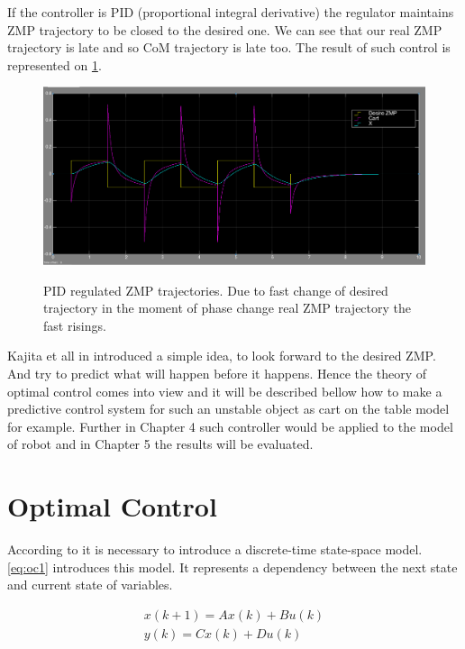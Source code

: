 \documentclass[12pt,a4paper]{report}
\begin{document}
		If the controller is PID (proportional integral derivative) the regulator maintains ZMP trajectory to be closed to the desired one. We can see that our real ZMP trajectory is late and so CoM trajectory is late too. The result of such control is represented on \cref{fig:10}.
		\begin{figure}[h!]
			\vspace{-0.2cm}
			\centering
			{\includegraphics[width=1\textwidth]{10}}
			\caption{PID regulated ZMP trajectories. Due to fast change of desired trajectory in the moment of phase change real ZMP trajectory the fast risings.}
			\label{fig:10}
			\vspace{-0.1cm}
		\end{figure}
		Kajita et all in \cite{kajita2003biped} introduced a simple idea, to look forward to the desired ZMP. And try to predict what will happen before it happens. Hence the theory of optimal control comes into view and it will be described bellow how to make a predictive control system for such an unstable object as cart on the table model for example. Further in Chapter 4 such controller would be applied to the model of robot and in Chapter 5 the results will be evaluated.
		
		\section{Optimal Control}
			According to \cite{hazell2008discrete} it is necessary to introduce a discrete-time state-space model. \ref{eq:oc1} introduces this model. It represents a dependency between the next state and current state of variables.
			
			\begin{equation}\label{eq:oc1}
				\begin{split}
					x(k+1) = Ax(k) + Bu(k)\\
					y(k) = Cx(k) + Du(k)
				\end{split}
			\end{equation}
			
\end{document}
